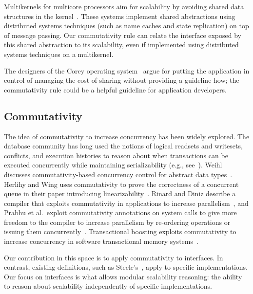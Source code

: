 
Multikernels for multicore processors aim for
scalability by avoiding shared data structures in
the kernel~\cite{barrelfish:sosp,wentzlaff:fos}.  These systems
implement shared abstractions using distributed systems techniques
(such as name caches and state replication) on top of message passing.
Our commutativity rule can relate the interface exposed by this shared
abstraction to its scalability, even if implemented using distributed
systems techniques on a multikernel.

The designers of the Corey operating system~\cite{boyd-wickizer:corey} argue for
putting the application in control of managing the cost of sharing
without providing a guideline how; the commutativity rule could be a
helpful guideline for application developers.

\subsection{Commutativity}

The idea of commutativity to increase
concurrency has been widely explored.  The database community has long used the
notions of logical readsets and writesets, conflicts, and execution histories
to reason about when transactions can be executed concurrently
while maintaining serializability (e.g., see~\cite{bernstein:concurrency}).
Weihl discusses commutativity-based concurrency control for abstract data
types~\cite{weihl:commutativity}.  Herlihy and Wing uses commutativity to prove
the correctness of a concurrent queue in their paper introducing
linearizability~\cite{herlihy:linearizability}.  Rinard and Diniz describe
a compiler that exploits commutativity in applications to increase
parallelism~\cite{rinard:commutativity}, and Prabhu et al.\ exploit
commutativity annotations on system calls to give more freedom to the
compiler to increase parallelism by re-ordering operations or issuing
them concurrently~\cite{prabhu:cset}.
Transactional boosting exploits
commutativity to increase concurrency in software transactional memory
systems~\cite{herlihy:boosting}.

Our contribution in this space is to apply commutativity to interfaces. In
contrast, existing definitions, such as Steele's~\cite{steele:commutativity},
apply to specific implementations. Our focus on interfaces is what allows
modular scalability reasoning: the ability to reason about scalability
independently of specific implementations.
